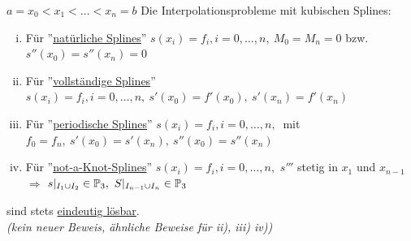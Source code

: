 \documentclass[../Skript.tex]{subfiles}
\begin{document}
\begin{theorem}
    \(a=x_0<x_1<\dots<x_n=b\) Die Interpolationsprobleme mit kubischen Splines:
    \begin{enumerate}[i)]
        \item Für ''\underline{natürliche Splines}'' \(s(x_i)=f_i, i=0,\dots,n,\ M_0=M_n=0\) bzw. \(s''(x_0)=s''(x_n)=0\)
        \item Für ''\underline{vollständige Splines}'' \(s(x_i)=f_i, i=0,\dots,n,\ s'(x_0)=f'(x_0),\ s'(x_n)=f'(x_n)\) 
        \item Für ''\underline{periodische Splines}'' \(s(x_i)=f_i, i=0,\dots,n,\ \) mit \(f_0=f_n,\ s'(x_0)=s'(x_n),\ 
        s''(x_0)=s''(x_n)\)
        \item Für ''\underline{not-a-Knot-Splines}'' \(s(x_i)=f_i, i=0,\dots,n,\) \(s'''\) stetig in \(x_1\) und 
        \(x_{n-1}\) \(\Rightarrow\) \(s\vert_{I_1\cup I_2}\in\bbP_3,\ S\vert_{I_{n-1}\cup I_n}\in\bbP_3\)
    \end{enumerate}
    sind stets \underline{eindeutig lösbar}.\\
    \textit{(kein neuer Beweis, ähnliche Beweise für ii), iii) iv))}
\end{theorem}
\end{document}
